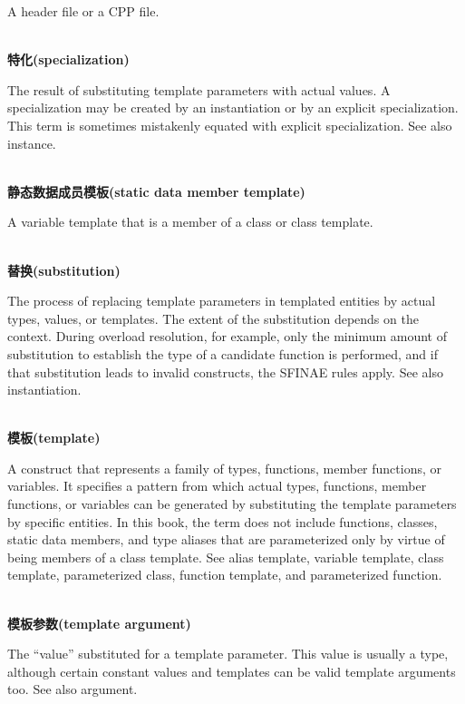A header file or a CPP file.

\hspace*{\fill} \\ %
\noindent
\textbf{特化(specialization)}

The result of substituting template parameters with actual values. A specialization may be created by an instantiation or by an explicit specialization. This term is sometimes mistakenly equated with explicit specialization. See also instance.

\hspace*{\fill} \\ %
\noindent
\textbf{静态数据成员模板(static data member template)}

A variable template that is a member of a class or class template.

\hspace*{\fill} \\ %
\noindent
\textbf{替换(substitution)}

The process of replacing template parameters in templated entities by actual types, values, or templates. The extent of the substitution depends on the context. During overload resolution, for example, only the minimum amount of substitution to establish the type of a candidate function is performed, and if that substitution leads to invalid constructs, the SFINAE rules apply. See also instantiation.

\hspace*{\fill} \\ %
\noindent
\textbf{模板(template)}

A construct that represents a family of types, functions, member functions, or variables. It specifies a pattern from which actual types, functions, member functions, or variables can be generated by substituting the template parameters by specific entities. In this book, the term does not include functions, classes, static data members, and type aliases that are parameterized only by virtue of being members of a class template. See alias template, variable template, class template, parameterized class, function template, and parameterized function.

\hspace*{\fill} \\ %
\noindent
\textbf{模板参数(template argument)}

The “value” substituted for a template parameter. This value is usually a type, although certain constant values and templates can be valid template arguments too. See also argument.

